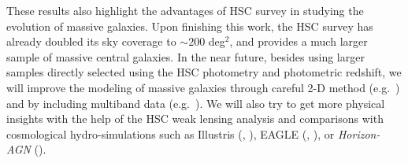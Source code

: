 \documentclass{emulateapj}
\newcommand{\update}[1]{\textcolor{Bittersweet}{#1}}
\begin{document}
\begin{CJK*}{UTF8}{gbsn}
    \update{
    These results also highlight the advantages of HSC survey in studying the 
    evolution of massive galaxies.
    Upon finishing this work, the HSC survey has already doubled its sky 
    coverage to $\sim 200$ deg$^2$, and provides a much larger sample of massive 
    central galaxies. 
    In the near future, besides using larger samples directly selected using the 
    HSC photometry and photometric redshift,
    we will improve the modeling of massive galaxies through careful 2-D method 
    (e.g.\ \citealt{Huang2013a}) and by including multiband data 
    (e.g.\ \citealt{Huang2016}).  
    We will also try to get more physical insights with the help of the HSC weak 
    lensing analysis and comparisons with cosmological hydro-simulations such as 
    Illustris (\citealt{Vogelsberger2014}, \citealt{Genel2014}), 
    EAGLE (\citealt{Schaye2015}, \citealt{Crain2015}), 
    or \textit{Horizon-AGN} (\citealt{Dubois2014}).
    }
    

\end{CJK*}
\end{document}
